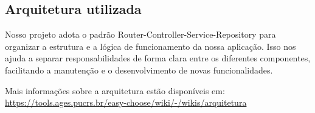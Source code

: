 \hypertarget{__RefHeading___Toc4737_3118176633}{}
\subsection{Arquitetura utilizada\originalspace{}}
\label{ages-i:text-h-0010}

\indent Nosso projeto adota o padrão Router-Controller-Service-Repository para \originalinlinetab{}organizar a estrutura e a lógica de funcionamento da nossa aplicação. Isso \originalinlinetab{}nos ajuda a separar responsabilidades de forma clara entre os diferentes \originalinlinetab{}componentes, facilitando a manutenção e o desenvolvimento de novas \originalinlinetab{}funcionalidades.\par

\noindent \originaltab{}Mais informações sobre a arquitetura estão disponíveis em: \url{https://tools.ages.pucrs.br/easy-choose/wiki/-/wikis/arquitetura}\par

